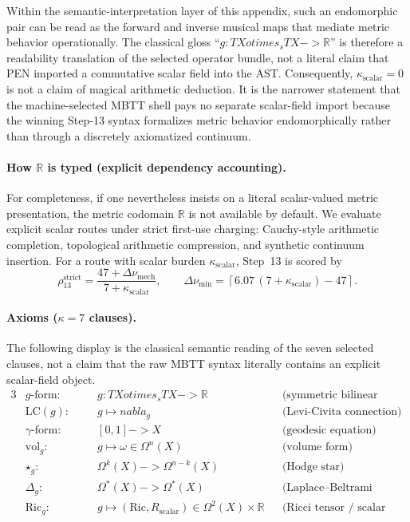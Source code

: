 \documentclass[11pt,a4paper]{article}
\def\to{->}%
\def\otimes{otimes}%
\def\nabla{nabla}%
\theoremstyle{plain}
\theoremstyle{definition}
\theoremstyle{remark}
\newcommand{\R}{\mathbb{R}}
\begin{document}
Within the semantic-interpretation layer of this appendix, such an endomorphic pair can be read as the forward and inverse musical maps that mediate metric behavior operationally.
The classical gloss ``$g : TX \otimes_s TX \to \R$'' is therefore a readability translation of the selected operator bundle, not a literal claim that PEN imported a commutative scalar field into the AST.
Consequently, $\kappa_{\mathrm{scalar}} = 0$ is not a claim of magical arithmetic deduction.
It is the narrower statement that the machine-selected MBTT shell pays no separate scalar-field import because the winning Step-13 syntax formalizes metric behavior endomorphically rather than through a discretely axiomatized continuum.

\paragraph{How $\R$ is typed (explicit dependency accounting).}
For completeness, if one nevertheless insists on a literal scalar-valued metric presentation, the metric codomain $\R$ is not available by default.
We evaluate explicit scalar routes under strict first-use charging: Cauchy-style arithmetic completion, topological arithmetic compression, and synthetic continuum insertion.
For a route with scalar burden $\kappa_{\mathrm{scalar}}$, Step~13 is scored by
\[
  \rho_{13}^{\mathrm{strict}} = \frac{47 + \Delta \nu_{\mathrm{mech}}}{7 + \kappa_{\mathrm{scalar}}},
  \qquad
  \Delta \nu_{\min} = \left\lceil 6.07\,(7+\kappa_{\mathrm{scalar}})-47\right\rceil.
\]

\paragraph{Axioms ($\kappa = 7$ clauses).}
The following display is the classical semantic reading of the seven selected clauses, not a claim that the raw MBTT syntax literally contains an explicit scalar-field object.
\begin{alignat*}{3}
    &g\text{-form:}           &\quad& g : TX \otimes_s TX \to \R
        && \text{(symmetric bilinear form)} \\
    &\mathrm{LC}(g)\text{:}  && g \mapsto \nabla_g
        && \text{(Levi-Civita connection)} \\
    &\gamma\text{-form:}     && [0,1] \to X
        && \text{(geodesic equation)} \\
    &\mathrm{vol}_g\text{:}  && g \mapsto \omega \in \Omega^n(X)
        && \text{(volume form)} \\
    &\star_g\text{:}          && \Omega^k(X) \to \Omega^{n-k}(X)
        && \text{(Hodge star)} \\
    &\Delta_g\text{:}         && \Omega^*(X) \to \Omega^*(X)
        && \text{(Laplace--Beltrami operator)} \\
    &\mathrm{Ric}_g\text{:}  && g \mapsto (\mathrm{Ric}, R_{\mathrm{scalar}}) \in \Omega^2(X) \times \R
        && \text{(Ricci tensor / scalar curvature)}
\end{alignat*}
\end{document}
